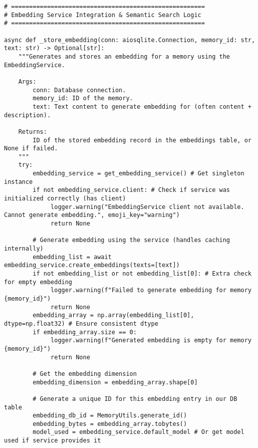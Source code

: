 \documentclass[12pt,a4paper]{article}
\begin{document}
\begin{pageablecode}
\begin{verbatim}
# ======================================================
# Embedding Service Integration & Semantic Search Logic
# ======================================================

async def _store_embedding(conn: aiosqlite.Connection, memory_id: str, text: str) -> Optional[str]:
    """Generates and stores an embedding for a memory using the EmbeddingService.

    Args:
        conn: Database connection.
        memory_id: ID of the memory.
        text: Text content to generate embedding for (often content + description).

    Returns:
        ID of the stored embedding record in the embeddings table, or None if failed.
    """
    try:
        embedding_service = get_embedding_service() # Get singleton instance
        if not embedding_service.client: # Check if service was initialized correctly (has client)
             logger.warning("EmbeddingService client not available. Cannot generate embedding.", emoji_key="warning")
             return None

        # Generate embedding using the service (handles caching internally)
        embedding_list = await embedding_service.create_embeddings(texts=[text])
        if not embedding_list or not embedding_list[0]: # Extra check for empty embedding
             logger.warning(f"Failed to generate embedding for memory {memory_id}")
             return None
        embedding_array = np.array(embedding_list[0], dtype=np.float32) # Ensure consistent dtype
        if embedding_array.size == 0:
             logger.warning(f"Generated embedding is empty for memory {memory_id}")
             return None

        # Get the embedding dimension
        embedding_dimension = embedding_array.shape[0]

        # Generate a unique ID for this embedding entry in our DB table
        embedding_db_id = MemoryUtils.generate_id()
        embedding_bytes = embedding_array.tobytes()
        model_used = embedding_service.default_model # Or get model used if service provides it


\end{verbatim}
\end{pageablecode}
\end{document}
